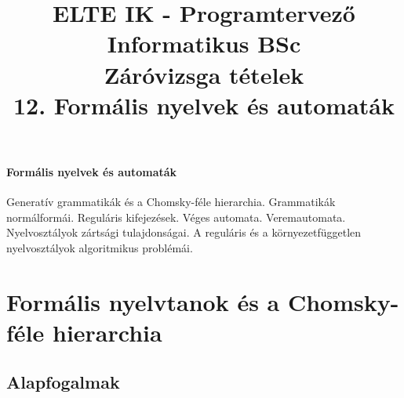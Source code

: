 \documentclass[margin=0px]{article}
\title{\textbf{{\Large ELTE IK - Programtervező Informatikus BSc} \vspace{0.2cm} \\ {\huge Záróvizsga tételek}} \vspace{0.3cm} \\ 12. Formális nyelvek és automaták}
\author{}
\date{}
\newenvironment{tetel}[1]{\paragraph{#1 \\}}{}
\begin{document}
\maketitle

\begin{tetel}{Formális nyelvek és automaták}
    Generatív grammatikák és a Chomsky-féle hierarchia. Grammatikák normálformái. Reguláris kifejezések. Véges automata. Veremautomata. Nyelvosztályok zártsági tulajdonságai. A reguláris és a környezetfüggetlen nyelvosztályok algoritmikus problémái.
\end{tetel}

\section{Formális nyelvtanok és a Chomsky-féle hierarchia}
\subsection{Alapfogalmak}
\end{document}
